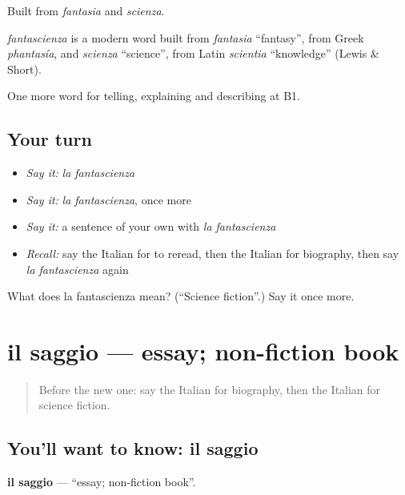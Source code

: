 Built from \emph{fantasia} and \emph{scienza}.

\begin{cousinweb}
\emph{fantascienza} is a modern word built from \emph{fantasia} \textquotedblleft{}fantasy\textquotedblright{}, from Greek \emph{phantasía}, and \emph{scienza} \textquotedblleft{}science\textquotedblright{}, from Latin \emph{scientia} \textquotedblleft{}knowledge\textquotedblright{} (Lewis \& Short).
\end{cousinweb}

\begin{grammarlens}[title={What you've built}]
One more word for telling, explaining and describing at B1.
\end{grammarlens}

\subsection*{Your turn}
\begin{itemize}
\raggedright
  \item \emph{Say it:} \emph{la fantascienza}
  \item \emph{Say it:} \emph{la fantascienza}, once more
  \item \emph{Say it:} a sentence of your own with \emph{la fantascienza}
  \item \emph{Recall:} say the Italian for to reread, then the Italian for biography, then say \emph{la fantascienza} again
\end{itemize}

\begin{tcolorbox}[breakable,colback=teal!4,colframe=teal!35!black,title={Before you move on}]
What does la fantascienza mean? (\textquotedblleft{}Science fiction\textquotedblright{}.) Say it once more.
\end{tcolorbox}
\section[il saggio]{il saggio — essay; non-fiction book}

\label{lesson:IT-C527-saggio}



\begin{quote}
Before the new one: say the Italian for biography, then the Italian for science fiction.
\end{quote}

\subsection*{You'll want to know: il saggio}
\textbf{il saggio} — \textquotedblleft{}essay; non-fiction book\textquotedblright{}.

